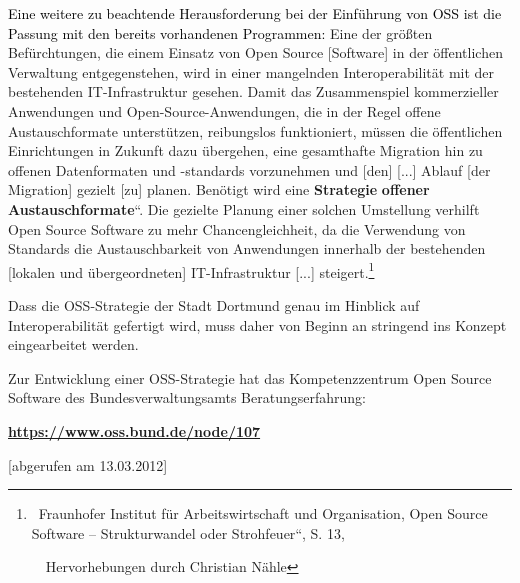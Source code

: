 \documentclass[a4paper]{article}
\newcommand\textstyleInternetlink[1]{\foreignlanguage{english}{\textcolor[rgb]{0.0,0.0,0.5019608}{#1}}}
\begin{document}
{
\textcolor{black}{Eine weitere zu beachtende Herausforderung bei der
Einf\"uhrung von OSS ist die Passung mit den bereits vorhandenen
Programmen: }{\guillemotright}Eine der gr\"o{\ss}ten Bef\"urchtungen,
die einem Einsatz von Open Source [Software] in der \"offentlichen
Verwaltung entgegenstehen, wird in einer mangelnden Interoperabilit\"at
mit der bestehenden IT-Infrastruktur gesehen. Damit das Zusammenspiel
kommerzieller Anwendungen und Open-Source-Anwendungen, die in der Regel
offene Austauschformate unterst\"utzen, reibungslos funktioniert,
m\"ussen die \"offentlichen Einrichtungen in Zukunft dazu \"ubergehen,
eine gesamthafte Migration hin zu offenen Datenformaten und
{}-standards vorzunehmen und [den] [...] Ablauf [der Migration] gezielt
[zu] planen. Ben\"otigt wird eine
{\quotedblbase}\textbf{Strategie}\textbf{ }\textbf{offener}\textbf{
}\textbf{Austauschformate}{\textquotedblleft}. Die gezielte Planung
einer solchen Umstellung verhilft Open Source Software zu mehr
Chancengleichheit, da die Verwendung von Standards die Austauschbarkeit
von Anwendungen innerhalb der bestehenden [lokalen und
\"ubergeordneten] IT-Infrastruktur [...]
steigert.{\guillemotleft}\footnote{\ Fraunhofer Institut f\"ur
Arbeitswirtschaft und Organisation, {\quotedblbase}Open Source Software
-- Strukturwandel oder Strohfeuer{\textquotedblleft}, S. 13,\par
\ \ Hervorhebungen durch Christian N\"ahle}}

{
Dass die OSS-Strategie der Stadt Dortmund genau im Hinblick auf
Interoperabilit\"at gefertigt wird, muss daher von Beginn an stringend
ins Konzept eingearbeitet werden.}



\bigskip

{
Zur Entwicklung einer OSS-Strategie hat das Kompetenzzentrum Open Source
Software des Bundesverwaltungsamts Beratungserfahrung:}


\bigskip

{\centering{}
\href{https://www.oss.bund.de/node/107}{\textstyleInternetlink{\textbf{http}}}\href{https://www.oss.bund.de/node/107}{\textstyleInternetlink{\textbf{s://www.oss.bund.de/node/107}}}
\par}

{\centering{}
\foreignlanguage{english}{[abgerufen}\foreignlanguage{english}{
}\foreignlanguage{english}{am}\foreignlanguage{english}{
}\foreignlanguage{english}{13.03.2012]}
\par}
\end{document}
